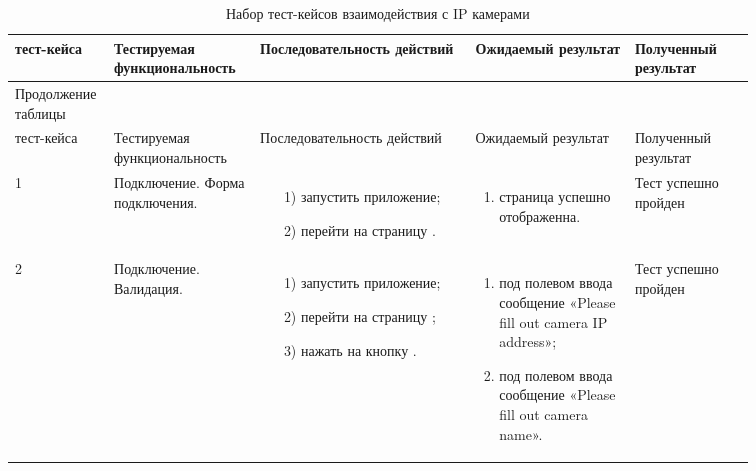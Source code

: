 \begin{longtable}{| >{\raggedright}m{0.06\linewidth} 
                  | >{\raggedright}m{0.18\linewidth} 
                  | >{\raggedright}m{0.27\linewidth} 
                  | >{\raggedright}m{0.2\linewidth} 
                  | >{\raggedright\arraybackslash}m{0.15\linewidth}|}
   \caption{Набор тест-кейсов взаимодействия с IP камерами} \label{table:testing:ip_cameras} \\

   \hline
   \No{} тест-кейса & Тестируемая функциональность & Последовательность действий & Ожидаемый результат & Полученный результат\\
   \endfirsthead

	\multicolumn{3}{@{} l}%
	{{Продолжение таблицы \thetable{}}} \\

	\hline
   	\No{} тест-кейса & Тестируемая функциональность & Последовательность действий & Ожидаемый результат & Полученный результат\\

	\hline 
	\endhead

	\hline
	1 & Подключение. Форма подключения. &
   			\begin{enumerate}
				\item[1)] запустить приложение;
				\item[2)] перейти на страницу \addCameraPage{}.
			\end{enumerate}
   			& 
   			\begin{enumerate}
   				\item страница \addCameraPage{} успешно отображенна.
   			\end{enumerate}
   			& Тест успешно пройден \\
	\hline
	2 & Подключение. Валидация. &
   			\begin{enumerate}
				\item[1)] запустить приложение;
				\item[2)] перейти на страницу \addCameraPage{};
				\item[3)] нажать на кнопку \connectButton{}.
			\end{enumerate}
   			& 
   			\begin{enumerate}
   				\item под полевом ввода \ipInput{} сообщение «Please fill out camera IP address»;
   				\item под полевом ввода \nameInput{} сообщение «Please fill out camera name».
   			\end{enumerate}
   			& Тест успешно пройден \\


\end{longtable}
